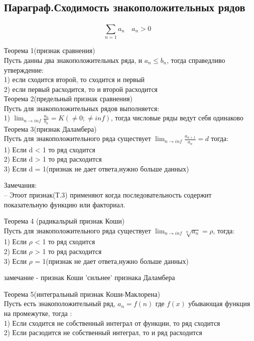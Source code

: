 \documentclass[a4paper, 12pt]{article}
\begin{document}
\subsection{Параграф.Сходимость знакоположительных рядов}
\[
  \sum_{n=1}^{}a_n \quad a_n > 0  
\]
\begin{mdframed}[backgroundcolor=blue!20] 
       Теорема 1(признак сравнения)\\
       Пусть данны два знакоположительных ряда, и $ a_n \leq b_n $, тогда справедливо утверждение:\\
       1) если сходится второй, то сходится и первый\\
       2) если первый расходится, то и второй расходится\\ 

       Теорема 2(предельный признак сравнения)\\
       Пусть для знакоположительных рядов выполняется:\\
       1) $ \lim_{n\to inf} \frac{a_n}{b_n} = K(\neq 0; \neq inf) $, тогда числовые ряды ведут себя одинаково\\

       Теорема 3(признак Даламбера)\\
       Пусть для знакоположительного ряда существует $ \lim_{n\to inf} \frac{a_{n+1}}{a_n} = d $ тогда:\\
       1) Если d < 1 то ряд сходится\\
       2) Если d > 1 то ряд расходится\\
       3) Если d = 1(признак не дает ответа,нужно больше данных)\\ 
    \end{mdframed}
Замечания:\\
-- Этоот признак(Т.3) применяют когда последовательность содержит показательную функцию или факториал.

\begin{mdframed}[backgroundcolor=blue!20] 
       Теорема 4 (радикальрый признак Коши)\\
       Пусть для знакоположительного ряда существует $ \lim_{n\to inf} \sqrt[n]{a_n} = \rho $, тогда:\\
       1) Если $ \rho $  < 1 то ряд сходится\\
       2) Если $ \rho $  > 1 то ряд расходится\\
       3) Если $ \rho $  = 1(признак не дает ответа,нужно больше данных)\\  
    \end{mdframed}
замечание - признак Коши 'сильнее' признака Даламбера
\begin{mdframed}[backgroundcolor=blue!20] 
       Теорема 5(интегральный признак Коши-Маклорена)\\
       Пусть есть знакоположительный ряд, $ a_n = f(n) $ где $ f(x) $ убывающая функция на промежутке, тогда :\\
       1) Если сходится не собственный интеграл от функции, то ряд сходится\\
       2) Если расзодится не собственный интеграл, то и ряд расходится\\  
    \end{mdframed}
\end{document}
